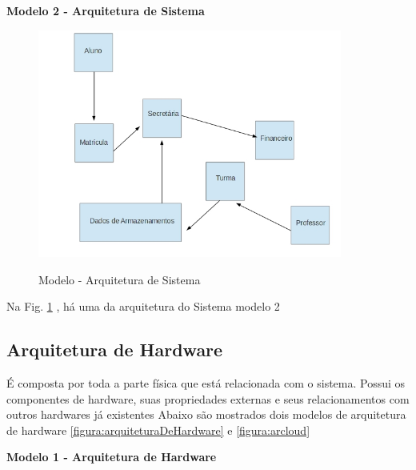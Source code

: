                 
                     \textbf{Modelo 2 - Arquitetura de Sistema }  
                
                
                  \begin{figure}[H]
                 \caption{Modelo - Arquitetura de Sistema}
               \centering %
                \includegraphics[width=10cm]{analisedeProjeto/modelo2Arquitetura} %
                \label{figura:modelo2Arquitetura}
                \end{figure}
                Na Fig. \ref{figura:modelo2Arquitetura} , há uma da arquitetura do Sistema modelo 2


                
                  \subsection{Arquitetura de Hardware}
  
 
É composta por toda a parte física que está relacionada com o sistema. Possui os componentes de hardware, suas propriedades externas e seus relacionamentos com outros hardwares já existentes
Abaixo são mostrados dois modelos de arquitetura de hardware   \ref{figura:arquiteturaDeHardware} e \ref{figura:arcloud}
  
   \textbf{Modelo 1 - Arquitetura de Hardware }
  
